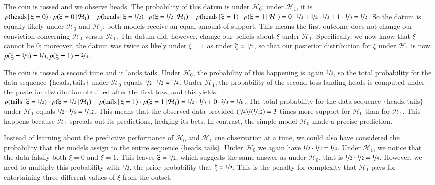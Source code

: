 \documentclass[man]{apa7}
\newcommand{\given}{\, | \,}
\begin{document}
The coin is tossed and we observe heads. The probability of this datum is  under $\mathcal{H}_0$; under $\mathcal{H}_1$, it is $p(\text{heads} \given \xi=0) \cdot p(\xi=0 \given \mathcal{H}_1) + p(\text{heads} \given \xi=\nicefrac{1}{2}) \cdot p(\xi=\nicefrac{1}{2} \given \mathcal{H}_1) + p(\text{heads} \given \xi=1) \cdot p(\xi=1 \given \mathcal{H}_1) = 0 \cdot \nicefrac{1}{3}  + \nicefrac{1}{2} \cdot \nicefrac{1}{3} + 1 \cdot \nicefrac{1}{3} = \nicefrac{1}{2}$. So the datum is equally likely under $\mathcal{H}_0$ and $\mathcal{H}_1$: both models receive an equal amount of support. This means the first outcome does not change our conviction concerning $\mathcal{H}_0$ versus $\mathcal{H}_1$. The datum did, however, change our beliefs about $\xi$ under $\mathcal{H}_1$. Specifically, we now know that $\xi$ cannot be 0; moreover, the datum was twice as likely under $\xi=1$ as under $\xi = \nicefrac{1}{2}$, so that our posterior distribution for $\xi$ under $\mathcal{H}_1$ is now $p(\xi = \nicefrac{1}{2}) = \nicefrac{1}{3}, p(\xi = 1) = \nicefrac{2}{3}$. 

The coin is tossed a second time and it lands tails. Under $\mathcal{H}_0$, the probability of this happening is again $\nicefrac{1}{2}$, so the total probability for the data sequence $\{\text{heads}, \text{tails}\}$ under $\mathcal{H}_0$ equals $\nicefrac{1}{2} \cdot \nicefrac{1}{2} = \nicefrac{1}{4}$. Under $\mathcal{H}_1$, the probability of the second toss landing heads is computed under the posterior distribution obtained after the first toss, and this yields: $p(\text{tails} \given \xi = \nicefrac{1}{2}) \cdot p(\xi=\nicefrac{1}{2} \given \mathcal{H}_1) + p(\text{tails} \given \xi = 1) \cdot p(\xi=1 \given \mathcal{H}_1) = \nicefrac{1}{2} \cdot \nicefrac{1}{3} + 0 \cdot \nicefrac{2}{3} = \nicefrac{1}{6}$. The total probability for the data sequence $\{\text{heads}, \text{tails}\}$ under $\mathcal{H}_1$ equals $\nicefrac{1}{2} \cdot \nicefrac{1}{6} = \nicefrac{1}{12}$. This means that the observed data provided $(\nicefrac{1}{4}) / (\nicefrac{1}{12}) = 3$ times more support for $\mathcal{H}_0$ than for $\mathcal{H}_1$. This happens because $\mathcal{H}_1$ spreads out its predictions, hedging its bets. In contrast, the simple model $\mathcal{H}_0$ made a precise prediction. 

Instead of learning about the predictive performance of $\mathcal{H}_0$ and $\mathcal{H}_1$ one observation at a time, we could also have considered the probability that the models assign to the entire sequence $\{\text{heads}, \text{tails}\}$. Under $\mathcal{H}_0$ we again have $\nicefrac{1}{2} \cdot \nicefrac{1}{2} = \nicefrac{1}{4}$. Under $\mathcal{H}_1$, we notice that the data falsify both $\xi=0$ and $\xi=1$. This leaves $\xi=\nicefrac{1}{2}$, which suggests the same answer as under $\mathcal{H}_0$, that is $\nicefrac{1}{2} \cdot \nicefrac{1}{2} = \nicefrac{1}{4}$. However, we need to multiply this probability with $\nicefrac{1}{3}$, the prior probability that $\xi=\nicefrac{1}{2}$. This is the penalty for complexity that $\mathcal{H}_1$ pays for entertaining three different values of $\xi$ from the outset. 
\end{document}
